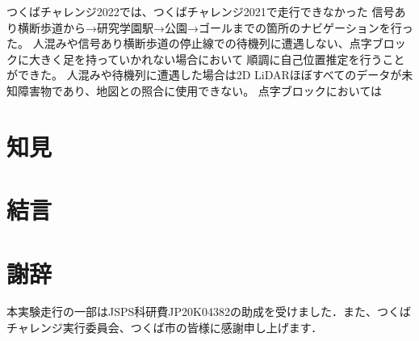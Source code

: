 \documentclass[twocolumn,9pt]{jsproceedings}
\begin{document}
つくばチャレンジ2022では、つくばチャレンジ2021で走行できなかった
信号あり横断歩道から→研究学園駅→公園→ゴールまでの箇所のナビゲーションを行った。
人混みや信号あり横断歩道の停止線での待機列に遭遇しない、点字ブロックに大きく足を持っていかれない場合において
順調に自己位置推定を行うことができた。
人混みや待機列に遭遇した場合は2D LiDARほぼすべてのデータが未知障害物であり、地図との照合に使用できない。
点字ブロックにおいては

\section{知見}


\section{結言}

\section*{謝辞}

本実験走行の一部はJSPS科研費JP20K04382の助成を受けました．また、つくばチャレンジ実行委員会、つくば市の皆様に感謝申し上げます．

\end{document}
